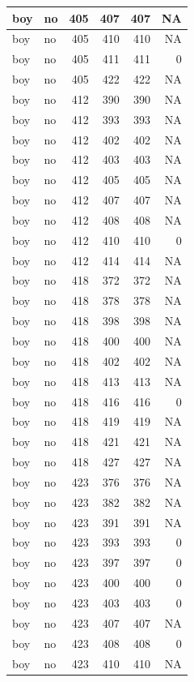 \documentclass[man]{apa6}
\begin{document}
\begin{tabular}{l|l|r|r|r|r}
\hline
boy & no & 405 & 407 & 407 & NA\\
\hline
boy & no & 405 & 410 & 410 & NA\\
\hline
boy & no & 405 & 411 & 411 & 0\\
\hline
boy & no & 405 & 422 & 422 & NA\\
\hline
boy & no & 412 & 390 & 390 & NA\\
\hline
boy & no & 412 & 393 & 393 & NA\\
\hline
boy & no & 412 & 402 & 402 & NA\\
\hline
boy & no & 412 & 403 & 403 & NA\\
\hline
boy & no & 412 & 405 & 405 & NA\\
\hline
boy & no & 412 & 407 & 407 & NA\\
\hline
boy & no & 412 & 408 & 408 & NA\\
\hline
boy & no & 412 & 410 & 410 & 0\\
\hline
boy & no & 412 & 414 & 414 & NA\\
\hline
boy & no & 418 & 372 & 372 & NA\\
\hline
boy & no & 418 & 378 & 378 & NA\\
\hline
boy & no & 418 & 398 & 398 & NA\\
\hline
boy & no & 418 & 400 & 400 & NA\\
\hline
boy & no & 418 & 402 & 402 & NA\\
\hline
boy & no & 418 & 413 & 413 & NA\\
\hline
boy & no & 418 & 416 & 416 & 0\\
\hline
boy & no & 418 & 419 & 419 & NA\\
\hline
boy & no & 418 & 421 & 421 & NA\\
\hline
boy & no & 418 & 427 & 427 & NA\\
\hline
boy & no & 423 & 376 & 376 & NA\\
\hline
boy & no & 423 & 382 & 382 & NA\\
\hline
boy & no & 423 & 391 & 391 & NA\\
\hline
boy & no & 423 & 393 & 393 & 0\\
\hline
boy & no & 423 & 397 & 397 & 0\\
\hline
boy & no & 423 & 400 & 400 & 0\\
\hline
boy & no & 423 & 403 & 403 & 0\\
\hline
boy & no & 423 & 407 & 407 & NA\\
\hline
boy & no & 423 & 408 & 408 & 0\\
\hline
boy & no & 423 & 410 & 410 & NA\\

\end{tabular}
\end{document}
